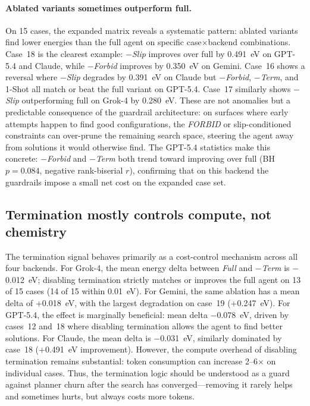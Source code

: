\paragraph{Ablated variants sometimes outperform full.}
On 15 cases, the expanded matrix reveals a systematic pattern: ablated variants find lower energies than the full agent on specific case$\times$backend combinations.
Case~18 is the clearest example: \textit{$-$Slip} improves over full by 0.491~eV on GPT-5.4 and Claude, while \textit{$-$Forbid} improves by 0.350~eV on Gemini.
Case~16 shows a reversal where \textit{$-$Slip} degrades by 0.391~eV on Claude but \textit{$-$Forbid}, \textit{$-$Term}, and 1-Shot all match or beat the full variant on GPT-5.4.
Case~17 similarly shows \textit{$-$Slip} outperforming full on Grok-4 by 0.280~eV.
These are not anomalies but a predictable consequence of the guardrail architecture: on surfaces where early attempts happen to find good configurations, the \textit{FORBID} or slip-conditioned constraints can over-prune the remaining search space, steering the agent away from solutions it would otherwise find.
The GPT-5.4 statistics make this concrete: \textit{$-$Forbid} and \textit{$-$Term} both trend toward improving over full (BH~$p = 0.084$, negative rank-biserial $r$), confirming that on this backend the guardrails impose a small net cost on the expanded case set.

\subsection{Termination mostly controls compute, not chemistry}

The termination signal behaves primarily as a cost-control mechanism across all four backends.
For Grok-4, the mean energy delta between \textit{Full} and \textit{$-$Term} is $-$0.012~eV; disabling termination strictly matches or improves the full agent on 13 of 15 cases (14 of 15 within 0.01~eV).
For Gemini, the same ablation has a mean delta of +0.018~eV, with the largest degradation on case~19 (+0.247~eV).
For GPT-5.4, the effect is marginally beneficial: mean delta $-$0.078~eV, driven by cases~12 and~18 where disabling termination allows the agent to find better solutions.
For Claude, the mean delta is $-$0.031~eV, similarly dominated by case~18 (+0.491~eV improvement).
However, the compute overhead of disabling termination remains substantial: token consumption can increase 2--6$\times$ on individual cases.
Thus, the termination logic should be understood as a guard against planner churn after the search has converged---removing it rarely helps and sometimes hurts, but always costs more tokens.

